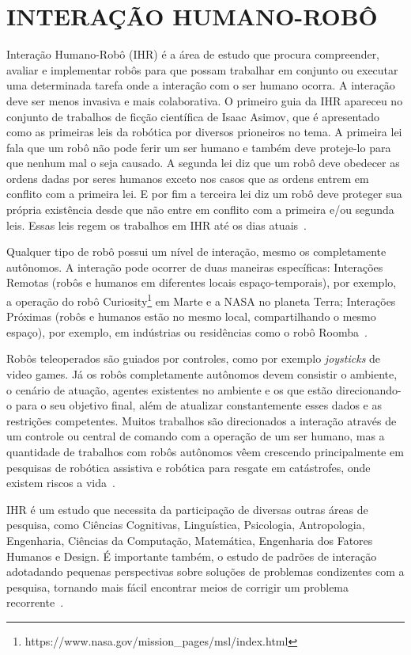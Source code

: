 \chapter{INTERAÇÃO HUMANO-ROBÔ}
\label{cap:ihr}
Interação Humano-Robô (IHR) é a área de estudo que procura compreender, avaliar e implementar robôs para que possam trabalhar em conjunto ou executar uma determinada tarefa onde a interação com o ser humano ocorra. A interação deve ser menos invasiva e mais colaborativa. O primeiro guia da IHR apareceu no conjunto de trabalhos de ficção científica de Isaac Asimov, que é apresentado como as primeiras leis da robótica por diversos prioneiros no tema. A primeira lei fala que um robô não pode ferir um ser humano e também deve proteje-lo para que nenhum mal o seja causado. A segunda lei diz que um robô deve obedecer as ordens dadas por seres humanos exceto nos casos que as ordens entrem em conflito com a primeira lei. E por fim a terceira lei diz um robô deve proteger sua própria existência desde que não entre em conflito com a primeira e/ou segunda leis. Essas leis regem os trabalhos em IHR até os dias atuais~\cite{goodrich:2007, weiss:2010}.

Qualquer tipo de robô possui um nível de interação, mesmo os completamente autônomos. A interação pode ocorrer de duas maneiras específicas: Interações Remotas (robôs e humanos em diferentes locais espaço-temporais), por exemplo, a operação do robô Curiosity\footnote{https://www.nasa.gov/mission\_pages/msl/index.html} em Marte e a NASA no planeta Terra; Interações Próximas (robôs e humanos estão no mesmo local, compartilhando o mesmo espaço), por exemplo, em indústrias ou residências como o robô Roomba~\cite{goodrich:2007}.

Robôs teleoperados são guiados por controles, como por exemplo \emph{joysticks} de video games. Já os robôs completamente autônomos devem consistir o ambiente, o cenário de atuação, agentes existentes no ambiente e os que estão direcionando-o para o seu objetivo final, além de atualizar constantemente esses dados e as restrições competentes. Muitos trabalhos são direcionados a interação através de um controle ou central de comando com a operação de um ser humano, mas a quantidade de trabalhos com robôs autônomos vêem crescendo principalmente em pesquisas de robótica assistiva e robótica para resgate em catástrofes, onde existem riscos a vida~\cite{goodrich:2007, weiss:2010}.

IHR é um estudo que necessita da participação de diversas outras áreas de pesquisa, como Ciências Cognitivas, Linguística, Psicologia, Antropologia, Engenharia, Ciências da Computação, Matemática, Engenharia dos Fatores Humanos e Design. É importante também, o estudo de padrões de interação adotadando pequenas perspectivas sobre soluções de problemas condizentes com a pesquisa, tornando mais fácil encontrar meios de corrigir um problema recorrente~\cite{goodrich:2007}.

